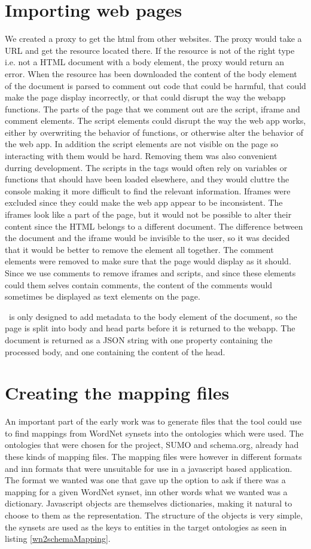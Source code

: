 \section{Importing web pages}
We created a proxy to get the html from other websites.
The proxy would take a URL and get the resource located there.
If the resource is not of the right type i.e. not a HTML document with a body element,
the proxy would return an error.
When the resource has been downloaded the content of the body element of the document is parsed to comment out code that
could be harmful, that could make the page display incorrectly, or that could disrupt the way the webapp functions.
The parts of the page that we comment out are the script, iframe and comment elements.
The script elements could disrupt the way the web app works, either by overwriting the behavior of functions,
or otherwise alter the behavior of the web app.
In addition the script elements are not visible on the page so interacting with them would be hard.
Removing them was also convenient durring development.
The scripts in the tags would often rely on variables or functions that should have been loaded elsewhere,
and they would cluttre the console making it more difficult to find the relevant information.
Iframes were excluded since they could make the web app appear to be inconsistent.
The iframes look like a part of the page,
but it would not be possible to alter their content since the HTML belongs to a different document.
The difference between the document and the iframe would be invisible to the user,
so it was decided that it would be better to remove the element all together.
The comment elements were removed to make sure that the page would display as it should.
Since we use comments to remove iframes and scripts, and since these elements could them selves contain comments,
the content of the comments would sometimes be displayed as text elements on the page.

\Theartefact\ is only designed to add metadata to the body element of the document,
so the page is split into body and head parts before it is returned to the webapp.
The document is returned as a JSON string with one property containing the processed body,
and one containing the content of the head.


\section{Creating the mapping files}
An important part of the early work was to generate files that the tool could use to find mappings from WordNet synsets
into the ontologies which were used.
The ontologies that were chosen for the project, SUMO  and schema.org, already had these kinds of mapping files.
The mapping files were however in different formats and inn formats that were unsuitable for use in a javascript based application.
The format we wanted was one that gave up the option to ask if there was a mapping for a given WordNet synset,
inn other words what we wanted was a dictionary.
Javascript objects are themselves dictionaries, making it natural to choose to them as the representation.
The structure of the objects is very simple,
the synsets are used as the keys to entities in the target ontologies as seen in listing \ref{wn2schemaMapping}.

